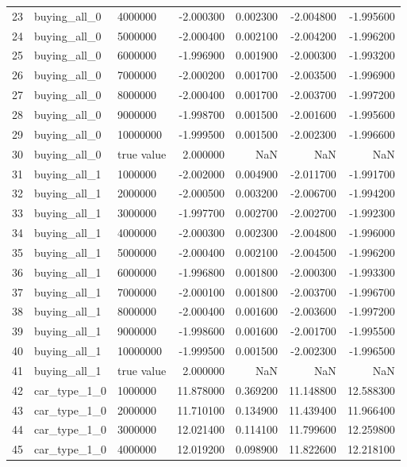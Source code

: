 \begin{tabular}{lllrrrr}
23 & buying_all_0 & 4000000 & -2.000300 & 0.002300 & -2.004800 & -1.995600 \\
24 & buying_all_0 & 5000000 & -2.000400 & 0.002100 & -2.004200 & -1.996200 \\
25 & buying_all_0 & 6000000 & -1.996900 & 0.001900 & -2.000300 & -1.993200 \\
26 & buying_all_0 & 7000000 & -2.000200 & 0.001700 & -2.003500 & -1.996900 \\
27 & buying_all_0 & 8000000 & -2.000400 & 0.001700 & -2.003700 & -1.997200 \\
28 & buying_all_0 & 9000000 & -1.998700 & 0.001500 & -2.001600 & -1.995600 \\
29 & buying_all_0 & 10000000 & -1.999500 & 0.001500 & -2.002300 & -1.996600 \\
30 & buying_all_0 & true value & 2.000000 & NaN & NaN & NaN \\
31 & buying_all_1 & 1000000 & -2.002000 & 0.004900 & -2.011700 & -1.991700 \\
32 & buying_all_1 & 2000000 & -2.000500 & 0.003200 & -2.006700 & -1.994200 \\
33 & buying_all_1 & 3000000 & -1.997700 & 0.002700 & -2.002700 & -1.992300 \\
34 & buying_all_1 & 4000000 & -2.000300 & 0.002300 & -2.004800 & -1.996000 \\
35 & buying_all_1 & 5000000 & -2.000400 & 0.002100 & -2.004500 & -1.996200 \\
36 & buying_all_1 & 6000000 & -1.996800 & 0.001800 & -2.000300 & -1.993300 \\
37 & buying_all_1 & 7000000 & -2.000100 & 0.001800 & -2.003700 & -1.996700 \\
38 & buying_all_1 & 8000000 & -2.000400 & 0.001600 & -2.003600 & -1.997200 \\
39 & buying_all_1 & 9000000 & -1.998600 & 0.001600 & -2.001700 & -1.995500 \\
40 & buying_all_1 & 10000000 & -1.999500 & 0.001500 & -2.002300 & -1.996500 \\
41 & buying_all_1 & true value & 2.000000 & NaN & NaN & NaN \\
42 & car_type_1_0 & 1000000 & 11.878000 & 0.369200 & 11.148800 & 12.588300 \\
43 & car_type_1_0 & 2000000 & 11.710100 & 0.134900 & 11.439400 & 11.966400 \\
44 & car_type_1_0 & 3000000 & 12.021400 & 0.114100 & 11.799600 & 12.259800 \\
45 & car_type_1_0 & 4000000 & 12.019200 & 0.098900 & 11.822600 & 12.218100 \\

\end{tabular}
